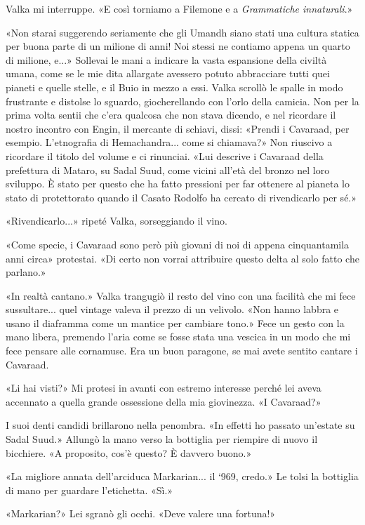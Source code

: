 Valka mi interruppe. «E così torniamo a Filemone e a \emph{Grammatiche
	innaturali}.»

«Non starai suggerendo seriamente che gli Umandh siano stati una cultura
statica per buona parte di un milione di anni! Noi stessi ne contiamo
appena un quarto di milione, e...» Sollevai le mani a indicare la vasta
espansione della civiltà umana, come se le mie dita allargate avessero
potuto abbracciare tutti quei pianeti e quelle stelle, e il Buio in
mezzo a essi. Valka scrollò le spalle in modo frustrante e distolse lo
sguardo, giocherellando con l'orlo della camicia. Non per la prima volta
sentii che c'era qualcosa che non stava dicendo, e nel ricordare il
nostro incontro con Engin, il mercante di schiavi, dissi: «Prendi i
Cavaraad, per esempio. L'etnografia di Hemachandra... come si chiamava?»
Non riuscivo a ricordare il titolo del volume e ci rinunciai. «Lui
descrive i Cavaraad della prefettura di Mataro, su Sadal Suud, come
vicini all'età del bronzo nel loro sviluppo. È stato per questo che ha
fatto pressioni per far ottenere al pianeta lo stato di protettorato
quando il Casato Rodolfo ha cercato di rivendicarlo per sé.»

«Rivendicarlo...» ripeté Valka, sorseggiando il vino.

«Come specie, i Cavaraad sono però più giovani di noi di appena
cinquantamila anni circa» protestai. «Di certo non vorrai attribuire
questo delta al solo fatto che parlano.»

«In realtà cantano.» Valka trangugiò il resto del vino con una facilità
che mi fece sussultare... quel vintage valeva il prezzo di un velivolo.
«Non hanno labbra e usano il diaframma come un mantice per cambiare
tono.» Fece un gesto con la mano libera, premendo l'aria come se fosse
stata una vescica in un modo che mi fece pensare alle cornamuse. Era un
buon paragone, se mai avete sentito cantare i Cavaraad.

«Li hai visti?» Mi protesi in avanti con estremo interesse perché lei
aveva accennato a quella grande ossessione della mia giovinezza. «I
Cavaraad?»

I suoi denti candidi brillarono nella penombra. «In effetti ho passato
un'estate su Sadal Suud.» Allungò la mano verso la bottiglia per
riempire di nuovo il bicchiere. «A proposito, cos'è questo? È davvero
buono.»

«La migliore annata dell'arciduca Markarian... il `969, credo.» Le tolsi
la bottiglia di mano per guardare l'etichetta. «Sì.»

«Markarian?» Lei sgranò gli occhi. «Deve valere una fortuna!»

